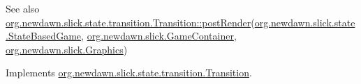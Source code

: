 \begin{DoxySeeAlso}{See also}
\mbox{\hyperlink{interfaceorg_1_1newdawn_1_1slick_1_1state_1_1transition_1_1_transition_ac113f4d5a19962a62a8adec7f9ab5d47}{org.\+newdawn.\+slick.\+state.\+transition.\+Transition\+::post\+Render}}(\mbox{\hyperlink{classorg_1_1newdawn_1_1slick_1_1state_1_1_state_based_game}{org.\+newdawn.\+slick.\+state.\+State\+Based\+Game}}, \mbox{\hyperlink{classorg_1_1newdawn_1_1slick_1_1_game_container}{org.\+newdawn.\+slick.\+Game\+Container}}, \mbox{\hyperlink{classorg_1_1newdawn_1_1slick_1_1_graphics}{org.\+newdawn.\+slick.\+Graphics}}) 
\end{DoxySeeAlso}


Implements \mbox{\hyperlink{interfaceorg_1_1newdawn_1_1slick_1_1state_1_1transition_1_1_transition_ac113f4d5a19962a62a8adec7f9ab5d47}{org.\+newdawn.\+slick.\+state.\+transition.\+Transition}}.


